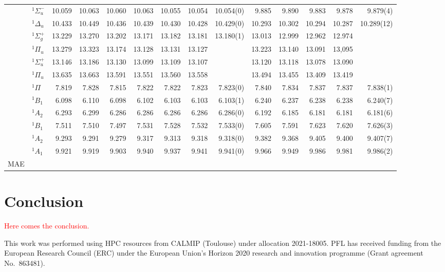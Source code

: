 \documentclass[aip,jcp,reprint,noshowkeys,superscriptaddress]{revtex4-1}
\newcommand{\titou}[1]{\textcolor{red}{#1}}
\begin{document}
\begin{squeezetable}
\begin{table*}
\begin{ruledtabular}
\begin{tabular}{llrrrrrrrrrrrr}
				&	$^1\Sigma_u^-$	&10.059	&10.063	&10.060	&10.063	&10.055	&10.054	&10.054(0)	&9.885	&9.890	&9.883	&9.878	&	9.879(4)\\
				&	$^1\Delta_u$ 	&10.433	&10.449	&10.436	&10.439	&10.430	&10.428	&10.429(0)	&10.293	&10.302	&10.294	&10.287	&	10.289(12)\\
				&	$^1\Sigma_g^+$	&13.229	&13.270	&13.202	&13.171	&13.182	&13.181	&13.180(1)	&13.013	&12.999	&12.962	&12.974	&	\\
				&	$^1\Pi_u$  		&13.279	&13.323	&13.174	&13.128	&13.131	&13.127	&			&13.223	&13.140	&13.091	&13,095	&	\\
				&	$^1\Sigma_u^+$	&13.146	&13.186	&13.130	&13.099	&13.109	&13.107	&			&13.120	&13.118	&13.078	&13.090	&	\\
				&	$^1\Pi_u$ 		&13.635	&13.663	&13.591	&13.551	&13.560	&13.558	&			&13.494	&13.455	&13.409	&13.419\\
	\ce{HCl}	&	$^1\Pi$ 		&7.819	&7.828	&7.815	&7.822	&7.822	&7.823	&7.823(0)	&7.840	&7.834	&7.837	&7.837	&7.838(1)\\
	\ce{H2S}	&	$^1B_1$  		&6.098	&6.110	&6.098	&6.102	&6.103	&6.103	&6.103(1)	&6.240	&6.237	&6.238	&6.238	&6.240(7)\\
				&	$^1A_2$  		&6.293	&6.299	&6.286	&6.286	&6.286	&6.286	&6.286(0)	&6.192	&6.185	&6.181	&6.181	&6.181(6) \\
	\ce{H2O}	&	$^1B_1$  		&7.511	&7.510	&7.497	&7.531	&7.528	&7.532	&7.533(0)	&7.605	&7.591	&7.623	&7.620	&7.626(3)\\
				&	$^1A_2$  		&9.293	&9.291	&9.279	&9.317	&9.313	&9.318	&9.318(0)	&9.382	&9.368	&9.405	&9.400	&9.407(7)\\
				&	$^1A_1$  		&9.921	&9.919	&9.903	&9.940	&9.937	&9.941	&9.941(0)	&9.966	&9.949	&9.986	&9.981	&9.986(2)\\
	\hline
	MAE			&					&	\\
	\end{tabular}
	\end{ruledtabular}
\end{table*}
\end{squeezetable}

\section{Conclusion}

\titou{Here comes the conclusion.}

\begin{acknowledgements}
This work was performed using HPC resources from CALMIP (Toulouse) under allocation 2021-18005.
PFL has received funding from the European Research Council (ERC) under the European Union's Horizon 2020 research and innovation programme (Grant agreement No.~863481).
\end{acknowledgements}
\end{document}
